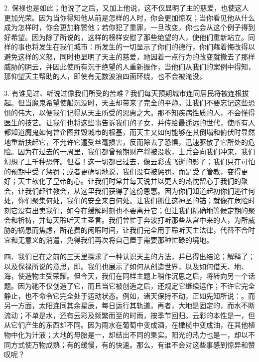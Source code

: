 2. 保禄也是如此；他说了之后，又加上他说，这不仅显明了主的慈爱，也使这人更加光荣。因为当你得知他从前是怎样的人时，你会更加惊叹；当你看见他从什么成为怎样时，你会更加称赞他；若你犯了重罪，一旦改变，你也会从这个例子得到好希望。因为除了所说的，这样的榜样安慰了那些绝望的人，使他们重新站立。同样的事也将发生在我们城市：所发生的一切显示了你们的德行，你们藉着悔改得以避免这样的义怒，同时也显明了天主的慈爱，祂因着一点行为的改变就撤去了那样威胁的阴云，并因此使所有沉于绝望的人重新振作，当他们从我们的案例中得知，那仰望天主帮助的人，即使有无数波浪四面环绕，也不会被淹没。\par

3. 有谁见过、听说过像我们所受的苦难？我们每天预期城市连同居民将被连根拔起。但当魔鬼希望使船沉没时，天主却带来了完全的平静。让我们不要忘记这些恐惧的伟大，以便我们记得从天主所受的恩惠之大。那不知疾病性质的人，不会懂得医生的技艺。让我们也将这些事告诉我们的子女，并传给最遥远的世代，使所有人都知道魔鬼如何曾企图摧毁城市的根基，而天主又如何能够在其倒塌和俯伏时显然地重新扶起它，不允许它遭受丝毫损害，反而除去了恐惧，迅速驱散了它所处的危险。因为在过去的一周里，我们都曾预期财产将被没收，士兵会向我们冲来，我们幻想了上千种恐怖。但看！这一切都已过去，像云彩或飞逝的影子；我们只在可怕的预期中受了惩罚；或者更确切地说，我们没有被惩罚，而是受了管教，变得更好；天主软化了皇帝的心。让我们时常并每天说并以更大的热忱留心于我们的聚会，让我们赶往教会，从这里我们获得了这份恩惠。因为你们知道起初你们逃往何处，你们聚集何处，我们的安全来自何处。让我们抓住这神圣的锚；就像在危险时刻它没有出卖我们，如今在缓解时刻也不要离开它；但让我们精确地等候定期的聚会和祈祷，并每天聆听天主圣言。我们曾忙于奔波打听那些从宫中来的人，为所威胁的祸患而焦虑，所花费的闲暇时间，让我们完全用于聆听天主法律，代替不合时宜和无意义的消遣，免得我们再次将自己置于需要那种忙碌的境地。\par

四、我们已在之前的三天里探求了一种认识天主的方法，并已得出结论；解释了；以及保禄所说的意思，即。我们也展示了如何从创造世界，以及如何借天、地、海，使造物主受荣耀。但今天，我们在同样主题上稍作沉思之后，将转向另一个话题。因为祂不仅创造了它，而且当它被创造之后，还规定它继续运作；不许它完全静止，也不命令它完全处于运动状态。例如，诸天保持不动，正如先知所说：。而另一方面，太阳连同其余星辰，每日运行其轨道。再者，大地是固定的，而水不断流动；不单是水，还有云彩及频繁而至的时雨，按季节回归。云彩的本性是一，但从它们产生的东西却不同。因为雨水在葡萄中变成酒，在橄榄中变成油，在其他植物中化为汁液；大地的母胎是一，却结出不同的果实。阳光的热力也是一，却以不同方式使万物成熟；有的缓慢，有的快速。那么，有谁不会对这些事感到惊异和赞叹呢？\par

